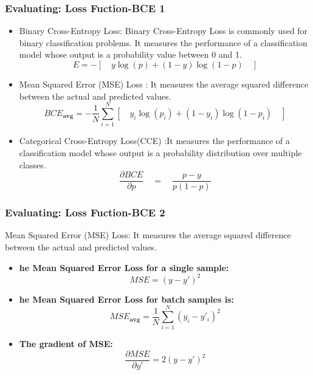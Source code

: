 \documentclass[aspectratio=1610]{beamer}
\begin{document}
\begin{frame}
    \frametitle{Evaluating: Loss Fuction-BCE 1}
    \begin{itemize}

        \item Binary Cross-Entropy Loss: Binary Cross-Entropy Loss is commonly used for binary classification problems. It measures the performance of a classification model whose output is a probability value between 0 and 1.    
            \[
              E = -\left[\quad y \log(p) + (1 - y) \log(1 - p) \quad\right]
            \]

        \item Mean Squared Error (MSE) Loss  : It measures the average squared difference between the actual and predicted values.
            \[
                BCE_{\textbf{avg}} = - \frac{1}{N} \sum_{i=1}^{N} \left[\quad y_i \log(p_i) + (1 - y_i) \log(1 - p_i) \quad\right]
            \]
        \item Categorical Cross-Entropy Loss(CCE) :It measures the performance of a classification model whose output is a probability distribution over multiple classes. 
            \[
            \frac{\partial BCE }{\partial p}  \quad=\quad \frac{p-y }{p(1-p)} \]
    \end{itemize}
\end{frame}

\begin{frame}
    \frametitle{Evaluating: Loss Fuction-BCE 2}
    Mean Squared Error (MSE) Loss: 
    It measures the average squared difference between the actual and predicted values. 
    \vspace{0.5cm}
    \begin{itemize}

        \item \textbf{he Mean Squared Error Loss for a single sample:}
        \[
            MSE = (y - y')^2
        \]

        \item \textbf{he Mean Squared Error Loss for batch samples is:}
        \[
        MSE_{\textbf{avg}}= \frac{1}{N} \sum_{i=1}^{N} (y_i - y'_i)^2
        \]
        \item \textbf{The gradient of MSE:}
       \[
       \frac{\partial MSE}{\partial y'} =  2(y-y')^2
       \]
    \end{itemize}
\end{frame}
\end{document}

